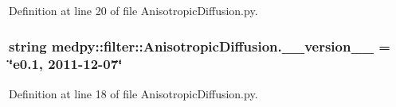 Definition at line 20 of file AnisotropicDiffusion.py.

\hypertarget{namespacemedpy_1_1filter_1_1AnisotropicDiffusion_ab382efe3e2502ac55440e5a0223550b8}{
\subsubsection[{\_\-\_\-version\_\-\_\-}]{\setlength{\rightskip}{0pt plus 5cm}string {\bf medpy::filter::AnisotropicDiffusion.\_\-\_\-version\_\-\_\-} = \char`\"{}e0.1, 2011-\/12-\/07\char`\"{}}}
\label{namespacemedpy_1_1filter_1_1AnisotropicDiffusion_ab382efe3e2502ac55440e5a0223550b8}


Definition at line 18 of file AnisotropicDiffusion.py.

